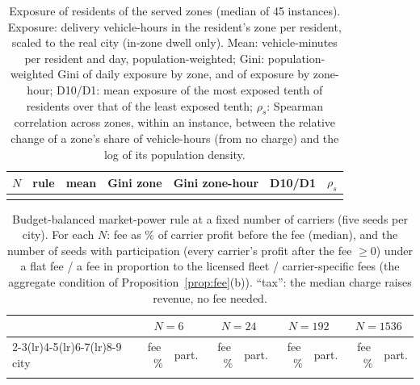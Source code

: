 \documentclass[preprint,11pt,authoryear]{elsarticle}
\theoremstyle{plain}
\theoremstyle{remark}
\begin{document}
\begin{table}[!ht]
\centering\footnotesize\setlength{\tabcolsep}{4pt}
\caption{Exposure of residents of the served zones (median of 45 instances). Exposure: delivery vehicle-hours in the resident's zone per resident, scaled to the real city (in-zone dwell only). Mean: vehicle-minutes per resident and day, population-weighted; Gini: population-weighted Gini of daily exposure by zone, and of exposure by zone-hour; D10/D1: mean exposure of the most exposed tenth of residents over that of the least exposed tenth; $\rho_s$: Spearman correlation across zones, within an instance, between the relative change of a zone's share of vehicle-hours (from no charge) and the log of its population density.}\label{tab:stake_exposure}
\begin{tabular}{rlrrrrr}
\toprule
$N$ & rule & mean & Gini zone & Gini zone-hour & D10/D1 & $\rho_s$\\
\midrule
\\
\bottomrule
\end{tabular}
\end{table}

\begin{table}[!ht]
\centering\footnotesize\setlength{\tabcolsep}{3.5pt}
\caption{Budget-balanced market-power rule at a fixed number of carriers (five seeds per city). For each $N$: fee as \% of carrier profit before the fee (median), and the number of seeds with participation (every carrier's profit after the fee $\ge0$) under a flat fee / a fee in proportion to the licensed fleet / carrier-specific fees (the aggregate condition of Proposition~\ref{prop:fee}(b)). ``tax'': the median charge raises revenue, no fee needed.}\label{tab:fees}
\begin{tabular}{lrcrcrcrc}
\toprule
& \multicolumn{2}{c}{$N=6$} & \multicolumn{2}{c}{$N=24$} & \multicolumn{2}{c}{$N=192$} & \multicolumn{2}{c}{$N=1536$}\\
\cmidrule(lr){2-3}\cmidrule(lr){4-5}\cmidrule(lr){6-7}\cmidrule(lr){8-9}
city & fee\,\% & part. & fee\,\% & part. & fee\,\% & part. & fee\,\% & part.\\
\midrule
\\
\bottomrule
\end{tabular}
\end{table}
\end{document}
